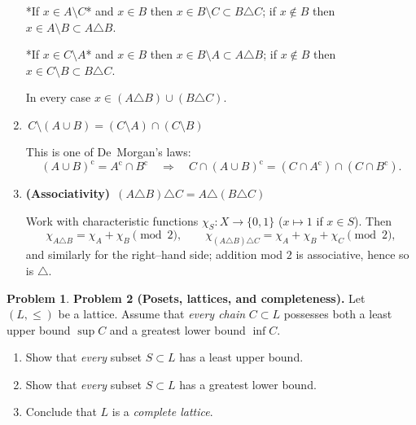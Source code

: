\documentclass[12pt]{article}
\theoremstyle{definition} %
\newtheorem{problem}{Problem}
\theoremstyle{plain} %
\begin{document}
\begin{enumerate}[label=\textbf{(\alph*)}]
      *If \(x\in A\setminus C\)* and \(x\in B\) then  
      \(x\in B\setminus C\subset B\triangle C\);  
      if \(x\notin B\) then \(x\in A\setminus B\subset A\triangle B\).

      *If \(x\in C\setminus A\)* and \(x\in B\) then  
      \(x\in B\setminus A\subset A\triangle B\);  
      if \(x\notin B\) then \(x\in C\setminus B\subset B\triangle C\).

      In every case \(x\in(A\triangle B)\cup(B\triangle C)\).

\item \(\boxed{\,C\setminus(A\cup B)=(C\setminus A)\cap(C\setminus B)\,}\)

      This is one of De~Morgan’s laws:
      \[
         (A\cup B)^{\mathrm c}=A^{\mathrm c}\cap B^{\mathrm c}
         \quad\Longrightarrow\quad
         C\cap(A\cup B)^{\mathrm c}
           =(C\cap A^{\mathrm c})\cap(C\cap B^{\mathrm c}).
      \]

\item \textbf{(Associativity)}  
      \(\boxed{\, (A\triangle B)\triangle C = A\triangle(B\triangle C)\,}\)

      Work with characteristic functions
      \(\chi_S\colon X\to\{0,1\}\) (\(x\mapsto1\) if \(x\in S\)).
      Then
      \[
         \chi_{A\triangle B}
           =\chi_A+\chi_B\pmod2,\qquad
         \chi_{(A\triangle B)\triangle C}
           =\chi_A+\chi_B+\chi_C\pmod2,
      \]
      and similarly for the right–hand side; addition mod \(2\) is
      associative, hence so is \(\triangle\).
\end{enumerate}
\begin{problem}
  \textbf{Problem 2 (Posets, lattices, and completeness).}
  Let \((L,\le)\) be a lattice.
  Assume that \emph{every chain} \(C\subset L\) possesses both a least
  upper bound \(\sup C\) and a greatest lower bound \(\inf C\).
  
  \begin{enumerate}[label=\textbf{(\alph*)}]
  \item Show that \emph{every} subset \(S\subset L\) has a least upper
        bound.
  \item Show that \emph{every} subset \(S\subset L\) has a greatest lower
        bound.
  \item Conclude that \(L\) is a \emph{complete lattice}.
  \end{enumerate}
  \end{problem}
  
\end{document}
